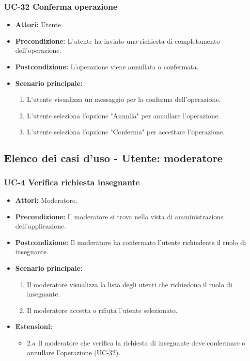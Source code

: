 \subsubsection{UC-32 Conferma operazione}		
\begin{itemize}
	\item \textbf{Attori:} Utente.
	\item \textbf{Precondizione:} L'utente ha inviato una richiesta di completamento dell'operazione.
	\item \textbf{Postcondizione:} L'operazione viene annullata o confermata.
	\item \textbf{Scenario principale:}
	\begin{enumerate}
		\item L'utente visualizza un messaggio per la conferma dell'operazione.
		\item L'utente seleziona l'opzione "Annulla" per annullare l'operazione.
		\item L'utente seleziona l'opzione "Conferma" per accettare l'operazione.
	\end{enumerate}		
\end{itemize}


\subsection{Elenco dei casi d'uso - Utente: moderatore}	
\subsubsection{UC-4 Verifica richiesta insegnante}
		\begin{itemize}
			\item \textbf{Attori:} Moderatore.
			\item \textbf{Precondizione:} Il moderatore si trova nella vista di amministrazione dell'applicazione.
			\item \textbf{Postcondizione:} Il moderatore ha confermato l'utente richiedente il ruolo di insegnante.
			\item \textbf{Scenario principale:}
				\begin{enumerate}
					\item Il moderatore visualizza la lista degli utenti che richiedono il ruolo di insegnante.
					\item Il moderatore accetta o rifiuta l'utente selezionato.
				\end{enumerate}
			\item \textbf{Estensioni:}
			\begin{itemize}
				\item 2.a Il moderatore che verifica la richiesta di insegnante deve confermare o annullare l'operazione (UC-32).
			\end{itemize}
		\end{itemize}
		
